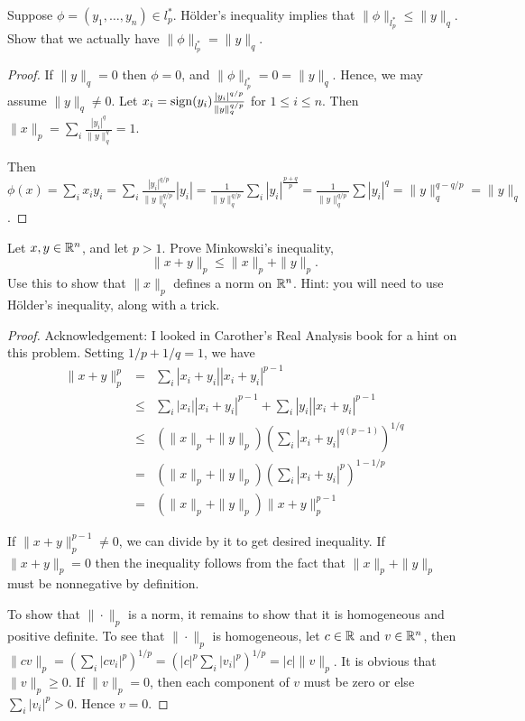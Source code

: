 \documentclass{article}
\begin{document}
 Suppose $\phi =(y_1, \ldots, y_n) \in l_p^*$. H\"{o}lder's inequality implies that $\|\phi\|_{l_p^*} \le \|y\|_q$. Show that we actually have $\|\phi\|_{l_p^*}  = \|y \|_q$.
\begin{proof}
If $\|y\|_q = 0$ then $\phi = 0$, and $\|\phi\|_{l_p^*} = 0 = \|y\|_q$.  Hence, we may assume $\|y\|_q \neq 0$.
Let $x_i = \operatorname{sign}(y_i) \frac {|y_i|^{q/p}}{\|y\|_q^{q/p}}$ for $1 \le i \le n$.  Then $\|x\|_p = \sum_i \frac {|y_i|^q} {\|y\|_q^q} = 1$.

Then $\phi(x) = \sum_i x_i y_i = \sum_i \frac {|y_i|^{q/p}}{\|y\|_q^{q/p}} |y_i| = \frac 1 {\|y\|_q^{q/p}} \sum_i |y_i|^{\frac {p + q} p }  = \frac 1 {\|y\|_q^{q/p}} \sum |y_i|^q = \|y\|_q^{q - q/p} = \|y\|_q$.

\end{proof}

 Let $x,y \in \mathbb{R}^n$, and let $p > 1$. Prove Minkowski's inequality, 
$$\|x + y \|_p \le \|x\|_p + \|y\|_p. $$
Use this to show that $\|x\|_p$ defines a norm on $\mathbb{R}^n$. Hint: you will need to use H\"{o}lder's inequality, along with a trick.

\begin{proof}
Acknowledgement: I looked in Carother's Real Analysis book for a hint on this problem. Setting $1/p + 1/q = 1$, we have 
\begin{align*}
\|x + y \|_p^p & = & \sum_i |x_i + y_i| |x_i + y_i|^{p-1}
\\ & \le & \sum_i |x_i| |x_i + y_i|^{p-1} + \sum_i |y_i| |x_i + y_i|^{p-1}
\\ & \le & ( \|x\|_p + \|y\|_p) \left( \sum_i |x_i + y_i|^{q(p-1)} \right)^{1/q}
\\ & = & ( \|x\|_p + \|y\|_p) \left( \sum_i |x_i + y_i|^p \right)^{1 - 1/p}
\\ & = &  ( \|x\|_p + \|y\|_p) \|x + y \|_p^{p - 1}
\end{align*}

If $\|x + y\|_p^{p-1} \neq 0$, we can divide by it to get desired inequality. If $\|x + y \|_p = 0$ then the inequality follows from the fact that $\|x\|_p + \|y\|_p$ must be nonnegative by definition.

To show that $\| \cdot \|_p$ is a norm, it remains to show that it is homogeneous and positive definite. To see that $\| \cdot \|_p$ is homogeneous, let $c \in \mathbb{R}$ and $v \in \mathbb{R}^n$, then $\|c v\|_p = \left( \sum_i |c v_i|^p \right)^{1/p} = \left(|c|^p \sum_i | v_i|^p \right)^{1/p} = |c| \|v\|_p$. It is obvious that $\|v\|_p \ge 0$.  If $\|v\|_p = 0$, then each component of $v$ must be zero or else $\sum_i |v_i|^p > 0$. Hence $v = 0$.

\end{proof}
\end{document}
